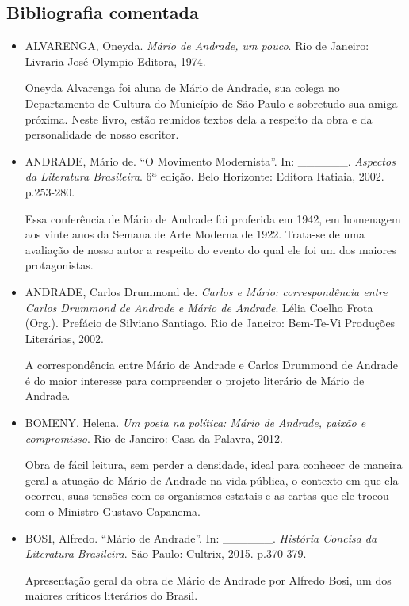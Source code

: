 \documentclass[11pt]{extarticle}
\begin{document}
\subsection{Bibliografia comentada}

\begin{itemize}
\item  ALVARENGA, Oneyda. \emph{Mário de Andrade, um pouco}. Rio de Janeiro:
Livraria José Olympio Editora, 1974.

Oneyda Alvarenga foi aluna de Mário de Andrade, sua colega no
Departamento de Cultura do Município de São Paulo e sobretudo sua amiga
próxima. Neste livro, estão reunidos textos dela a respeito da obra e da
personalidade de nosso escritor.

\item ANDRADE, Mário de. ``O Movimento Modernista''. In: \_\_\_\_\_\_.
\emph{Aspectos da Literatura Brasileira}. 6ª edição. Belo Horizonte:
Editora Itatiaia, 2002. p.253-280.

Essa conferência de Mário de Andrade foi proferida em 1942, em homenagem
aos vinte anos da Semana de Arte Moderna de 1922. Trata-se de uma
avaliação de nosso autor a respeito do evento do qual ele foi um dos
maiores protagonistas.

\item ANDRADE, Carlos Drummond de. \emph{Carlos e Mário: correspondência
entre Carlos Drummond de Andrade e Mário de Andrade}. Lélia Coelho Frota
(Org.). Prefácio de Silviano Santiago. Rio de Janeiro: Bem-Te-Vi
Produções Literárias, 2002.

A correspondência entre Mário de Andrade e Carlos Drummond de Andrade é
do maior interesse para compreender o projeto literário de Mário de
Andrade.

\item BOMENY, Helena. \emph{Um poeta na política: Mário de Andrade, paixão e
compromisso}. Rio de Janeiro: Casa da Palavra, 2012.

Obra de fácil leitura, sem perder a densidade, ideal para conhecer de
maneira geral a atuação de Mário de Andrade na vida pública, o contexto
em que ela ocorreu, suas tensões com os organismos estatais e as cartas
que ele trocou com o Ministro Gustavo Capanema.

\item BOSI, Alfredo. ``Mário de Andrade''. In: \_\_\_\_\_\_. \emph{História
Concisa da Literatura Brasileira}. São Paulo: Cultrix, 2015.
p.370-379.

Apresentação geral da obra de Mário de Andrade por Alfredo Bosi, um dos
maiores críticos literários do Brasil.


\end{itemize}
\end{document}
